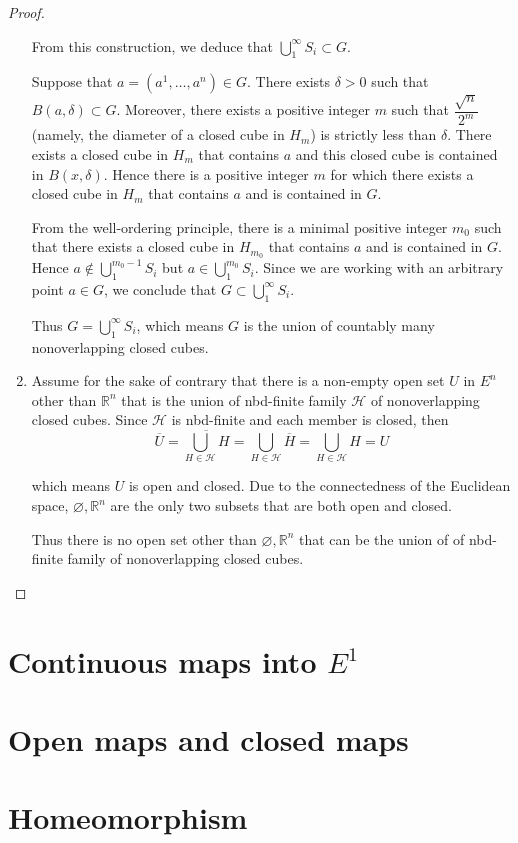 \begin{proof}
\begin{enumerate}[label={(\alph*)}]
		      From this construction, we deduce that \( \bigcup^{\infty}_{1} S_{i} \subset G \).

		      Suppose that \( a = (a^{1}, \ldots, a^{n}) \in G \). There exists \( \delta > 0 \) such that \( B(a, \delta) \subset G \). Moreover, there exists a positive integer \(m\) such that \( \dfrac{\sqrt{n}}{2^{m}} \) (namely, the diameter of a closed cube in \(H_{m}\)) is strictly less than \( \delta \). There exists a closed cube in \(H_{m}\) that contains \( a \) and this closed cube is contained in \( B(x, \delta) \). Hence there is a positive integer \( m \) for which there exists a closed cube in \( H_{m} \) that contains \( a \) and is contained in \( G \).

		      From the well-ordering principle, there is a minimal positive integer \( m_{0} \) such that there exists a closed cube in \( H_{m_{0}} \) that contains \( a \) and is contained in \( G \). Hence \( a \notin \bigcup^{m_{0} - 1}_{1} S_{i} \) but \( a \in \bigcup^{m_{0}}_{1} S_{i} \). Since we are working with an arbitrary point \( a \in G \), we conclude that \( G \subset \bigcup^{\infty}_{1} S_{i} \).

		      Thus \( G = \bigcup^{\infty}_{1} S_{i} \), which means \( G \) is the union of countably many nonoverlapping closed cubes.
		\item Assume for the sake of contrary that there is a non-empty open set \( U \) in \( E^{n} \) other than \( \mathbb{R}^{n} \) that is the union of nbd-finite family \( \mathscr{H} \) of nonoverlapping closed cubes. Since \( \mathscr{H} \) is nbd-finite and each member is closed, then
		      \[
			      \overline{U} = \overline{\bigcup_{H \in \mathscr{H}} H} = \bigcup_{H \in \mathscr{H}} \overline{H} = \bigcup_{H \in \mathscr{H}} H = U
		      \]

		      which means \( U \) is open and closed. Due to the connectedness of the Euclidean space, \( \varnothing, \mathbb{R}^{n} \) are the only two subsets that are both open and closed.

		      Thus there is no open set other than \( \varnothing, \mathbb{R}^{n} \) that can be the union of of nbd-finite family of nonoverlapping closed cubes.
	\end{enumerate}
\end{proof}

\section{Continuous maps into \( E^{1} \)}

\section{Open maps and closed maps}

\section{Homeomorphism}

